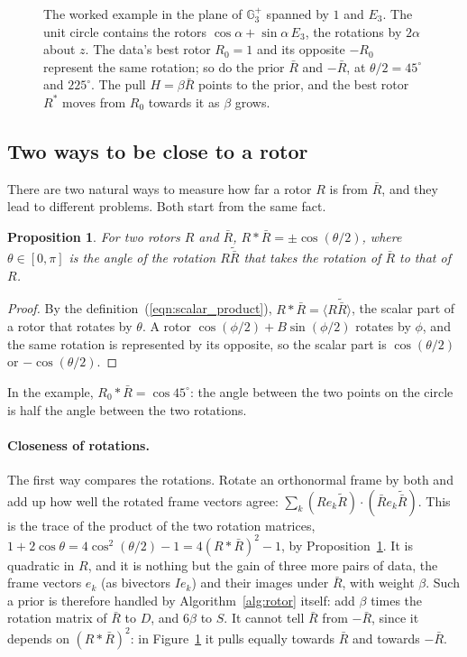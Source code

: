 \documentclass{birkjour}
\newtheorem{prop}[thm]{Proposition}
\theoremstyle{definition}
\theoremstyle{remark}
\numberwithin{equation}{section}
\newcommand{\rev}[1]{\widetilde{#1}}
\newcommand{\scal}[1]{\langle #1 \rangle}
\newcommand{\Ge}{\mathbb{G}}
\begin{document}
\begin{figure}[t]
\centering
{}
\caption{The worked example in the plane of $\Ge_3^+$ spanned by $1$ and $E_3$. The unit circle contains the rotors $\cos\alpha + \sin\alpha\, E_3$, the rotations by $2\alpha$ about $z$. The data's best rotor $R_0 = 1$ and its opposite $-R_0$ represent the same rotation; so do the prior $\bar R$ and $-\bar R$, at $\theta/2 = 45^\circ$ and $225^\circ$. The pull $H = \beta \bar R$ points to the prior, and the best rotor $R^*$ moves from $R_0$ towards it as $\beta$ grows.}
\label{fig:prior_circle}
\end{figure}

\subsection{Two ways to be close to a rotor}

There are two natural ways to measure how far a rotor $R$ is from $\bar R$, and they lead to different problems. Both start from the same fact.
\begin{prop}
\label{prop:rotor_angle}
For two rotors $R$ and $\bar R$, $R * \bar R = \pm \cos(\theta / 2)$, where $\theta \in [0, \pi]$ is the angle of the rotation $R \rev{\bar R}$ that takes the rotation of $\bar R$ to that of $R$.
\end{prop}
\begin{proof}
By the definition~(\ref{eqn:scalar_product}), $R * \bar R = \scal{R \rev{\bar R}}$, the scalar part of a rotor that rotates by $\theta$. A rotor $\cos(\phi/2) + B \sin(\phi/2)$ rotates by $\phi$, and the same rotation is represented by its opposite, so the scalar part is $\cos(\theta/2)$ or $-\cos(\theta/2)$.
\end{proof}
In the example, $R_0 * \bar R = \cos 45^\circ$: the angle between the two points on the circle is half the angle between the two rotations.

\paragraph{Closeness of rotations.} The first way compares the rotations. Rotate an orthonormal frame by both and add up how well the rotated frame vectors agree: $\sum_k (R e_k \rev{R}) \cdot (\bar R e_k \rev{\bar R})$. This is the trace of the product of the two rotation matrices, $1 + 2 \cos \theta = 4 \cos^2(\theta/2) - 1 = 4 (R * \bar R)^2 - 1$, by Proposition~\ref{prop:rotor_angle}. It is quadratic in $R$, and it is nothing but the gain of three more pairs of data, the frame vectors $e_k$ (as bivectors $I e_k$) and their images under $\bar R$, with weight $\beta$. Such a prior is therefore handled by Algorithm~\ref{alg:rotor} itself: add $\beta$ times the rotation matrix of $\bar R$ to $D$, and $6 \beta$ to $S$. It cannot tell $\bar R$ from $-\bar R$, since it depends on $(R * \bar R)^2$: in Figure~\ref{fig:prior_circle} it pulls equally towards $\bar R$ and towards $-\bar R$.
\end{document}
